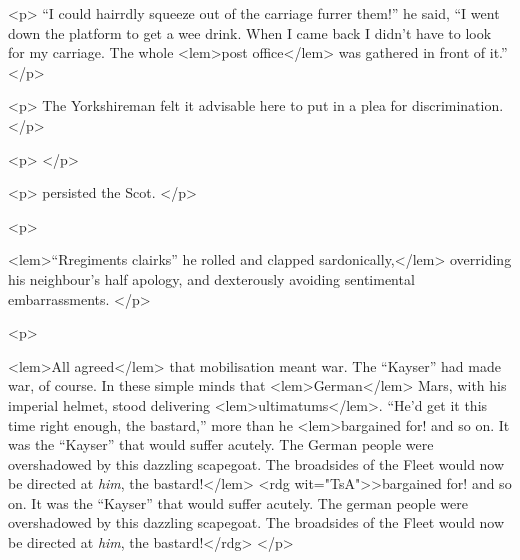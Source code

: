 {{				<p>
					“I could hairrdly squeeze out of the carriage furrer them!” he said, “I went down the 
					platform to get a wee drink. When I came back I didn't have to look for my carriage. 
					The whole 
<lem>post office</lem>
						{} 
					was gathered in front of it.” 
 				</p>

				<p>
					The Yorkshireman felt it advisable here to put in a plea for discrimination. 
 				</p>

				<p>
					{} 
 				</p>

				<p>
						{} 
					persisted the Scot. 
 				</p>

				<p>
					
<lem>“Rregiments clairks” he rolled and clapped sardonically,</lem>
						{} 
					overriding 
					his neighbour's half apology, and dexterously avoiding sentimental embarrassments. 
 				</p>

				<p>
					
<lem>All agreed</lem>
						{} 
					that mobilisation meant war. The “Kayser” had made war, of 
					course. In these simple minds that 
<lem>German</lem>{} Mars, with his imperial helmet, stood 
					delivering 
<lem>ultimatums</lem>{}. 
					“He'd get it this time right enough,
                                        the bastard,” more than he 
                                        <lem>bargained for!  
					and so on. It was the “Kayser” that would suffer acutely. The 
German people 
					were overshadowed by this dazzling scapegoat. The broadsides of the Fleet would 
					now be directed at \emph{him}, the
                                        bastard!</lem>
                                        <rdg wit="TsA">>bargained for!  
					and so on. It was the “Kayser” that would suffer acutely. The 
german people 
					were overshadowed by this dazzling scapegoat. The broadsides of the Fleet would 
					now be directed at \emph{him}, the
                                        bastard!</rdg>
						{} 
 				</p>

}}
